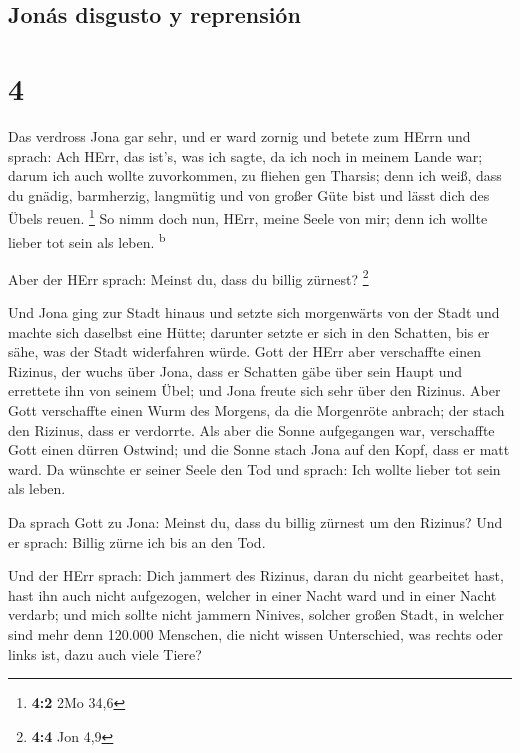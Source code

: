 \hypertarget{jonuxe1s-disgusto-y-reprensiuxf3n}{%
\subsection{Jonás disgusto y
reprensión}\label{jonuxe1s-disgusto-y-reprensiuxf3n}}

\hypertarget{section-3}{%
\section{4}\label{section-3}}

 Das verdross Jona gar sehr, und er ward zornig
 und betete zum HErrn und sprach: Ach HErr, das ist's, was
ich sagte, da ich noch in meinem Lande war; darum ich auch wollte
zuvorkommen, zu fliehen gen Tharsis; denn ich weiß, dass du gnädig,
barmherzig, langmütig und von großer Güte bist und lässt dich des Übels
reuen. \footnote{\textbf{4:2} 2Mo 34,6}  So nimm doch nun,
HErr, meine Seele von mir; denn ich wollte lieber tot sein als leben.
\textsuperscript{b}

 Aber der HErr sprach: Meinst du, dass du billig zürnest?
\footnote{\textbf{4:4} Jon 4,9}

 Und Jona ging zur Stadt hinaus und setzte sich
morgenwärts von der Stadt und machte sich daselbst eine Hütte; darunter
setzte er sich in den Schatten, bis er sähe, was der Stadt widerfahren
würde.  Gott der HErr aber verschaffte einen Rizinus, der
wuchs über Jona, dass er Schatten gäbe über sein Haupt und errettete ihn
von seinem Übel; und Jona freute sich sehr über den Rizinus.
 Aber Gott verschaffte einen Wurm des Morgens, da die
Morgenröte anbrach; der stach den Rizinus, dass er verdorrte.
 Als aber die Sonne aufgegangen war, verschaffte Gott
einen dürren Ostwind; und die Sonne stach Jona auf den Kopf, dass er
matt ward. Da wünschte er seiner Seele den Tod und sprach: Ich wollte
lieber tot sein als leben.

 Da sprach Gott zu Jona: Meinst du, dass du billig zürnest
um den Rizinus? Und er sprach: Billig zürne ich bis an den Tod.

 Und der HErr sprach: Dich jammert des Rizinus, daran du
nicht gearbeitet hast, hast ihn auch nicht aufgezogen, welcher in einer
Nacht ward und in einer Nacht verdarb;  und mich sollte
nicht jammern Ninives, solcher großen Stadt, in welcher sind mehr denn
120.000 Menschen, die nicht wissen Unterschied, was rechts oder links
ist, dazu auch viele Tiere?
